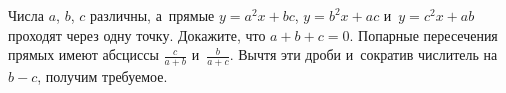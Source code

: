 \problem
Числа $a$, $b$, $c$ различны, а~прямые
$y = a^2 x + b c$, $y = b^2 x + a c$ и~$y = c^2 x + a b$
проходят через одну точку.
Докажите, что $a + b + c = 0$.
\solution
Попарные пересечения прямых имеют абсциссы
$\frac{c}{a + b}$ и~$\frac{b}{a + c}$.
Вычтя эти дроби и~сократив числитель на~$b - c$, получим требуемое.
\endproblem
